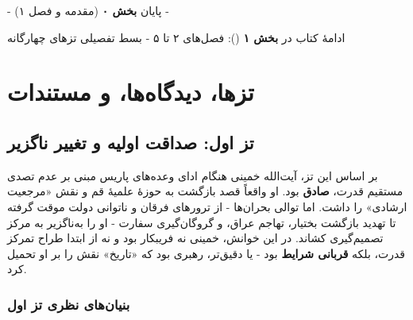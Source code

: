 \documentclass[12pt,a4paper]{book}
\newcommand{\keyword}[1]{\textbf{\textcolor{cPrimary}{#1}}}
\newcommand{\en}[1]{\lr{\textit{#1}}}
\begin{document}
\vspace{1cm}

\begin{center}

\vspace{0.5cm}
{\small\color{cGray} - پایان \textbf{بخش ۰} (مقدمه و فصل ۱) -}

\vspace{0.3cm}
{\small\color{cGray} ادامهٔ کتاب در \textbf{بخش ۱} (\en{Segment 1}): فصل‌های ۲ تا ۵ - بسط تفصیلی تزهای چهارگانه}
\end{center}


\part{تزها، دیدگاه‌ها، و مستندات}

\chapter{تز اول: صداقت اولیه و تغییر ناگزیر}
\label{chap:b696ec}


\begin{infoBox}
بر اساس این تز، آیت‌الله خمینی هنگام ادای وعده‌های پاریس مبنی بر عدم تصدی مستقیم قدرت، \keyword{صادق} بود. او واقعاً قصد بازگشت به حوزهٔ علمیهٔ قم و نقش «مرجعیت ارشادی» را داشت. اما توالی بحران‌ها - از ترورهای فرقان و ناتوانی دولت موقت گرفته تا تهدید بازگشت بختیار، تهاجم عراق، و گروگان‌گیری سفارت - او را به‌ناگزیر به مرکز تصمیم‌گیری کشاند. در این خوانش، خمینی نه فریبکار بود و نه از ابتدا طراح تمرکز قدرت، بلکه \keyword{قربانی شرایط} بود - یا دقیق‌تر، رهبری بود که «تاریخ» نقش را بر او تحمیل کرد.
\end{infoBox}

\section{بنیان‌های نظری تز اول}
\end{document}
